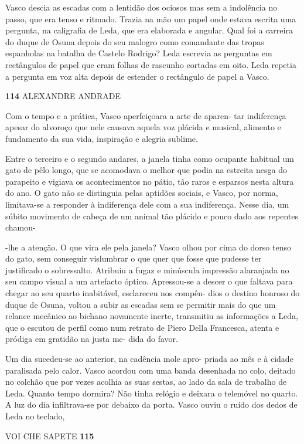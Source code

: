 Vasco descia as escadas com a lentidão dos ociosos mas sem a indolência
no passo, que era tenso e ritmado. Trazia na mão um papel onde estava
escrita uma pergunta, na caligrafia de Leda, que era elaborada e
angular. Qual foi a carreira do duque de Osuna depois do seu malogro
como comandante das tropas espanholas na batalha de Castelo Rodrigo?
Leda escrevia as perguntas em rectângulos de papel que eram folhas de
rascunho cortadas em oito. Leda repetia a pergunta em voz alta depois de
estender o rectângulo de papel a Vasco.

\textbf{114 }ALEXANDRE ANDRADE

Com o tempo e a prática, Vasco aperfeiçoara a arte de aparen- tar
indiferença apesar do alvoroço que nele causava aquela voz plácida e
musical, alimento e fundamento da sua vida, inspiração e alegria
sublime.

Entre o terceiro e o segundo andares, a janela tinha como ocupante
habitual um gato de pêlo longo, que se acomodava o melhor que podia na
estreita nesga do parapeito e vigiava os acontecimentos no pátio, tão
raros e esparsos nesta altura do ano. O gato não se distinguia pelas
aptidões sociais, e Vasco, por norma, limitava-se a responder à
indiferença dele com a sua indiferença. Nesse dia, um súbito movimento
de cabeça de um animal tão plácido e pouco dado aos repentes chamou-

-lhe a atenção. O que vira ele pela janela? Vasco olhou por cima do
dorso tenso do gato, sem conseguir vislumbrar o que quer que fosse que
pudesse ter justificado o sobressalto. Atribuiu a fugaz e minúscula
impressão alaranjada no seu campo visual a um artefacto óptico.
Apressou-se a descer o que faltava para chegar ao seu quarto inabitável,
esclareceu nos compên- dios o destino honroso do duque de Osuna, voltou
a subir as escadas sem se permitir mais do que um relance mecânico ao
bichano novamente inerte, transmitiu as informações a Leda, que o
escutou de perfil como num retrato de Piero Della Francesca, atenta e
pródiga em gratidão na justa me- dida do favor.

Um dia sucedeu-se ao anterior, na cadência mole apro- priada ao mês e à
cidade paralisada pelo calor. Vasco acordou com uma banda desenhada no
colo, deitado no colchão que por vezes acolhia as suas sestas, ao lado
da sala de trabalho de Leda. Quanto tempo dormira? Não tinha relógio e
deixara o telemóvel no quarto. A luz do dia infiltrava-se por debaixo da
porta. Vasco ouviu o ruído dos dedos de Leda no teclado,

VOI CHE SAPETE \textbf{115}

